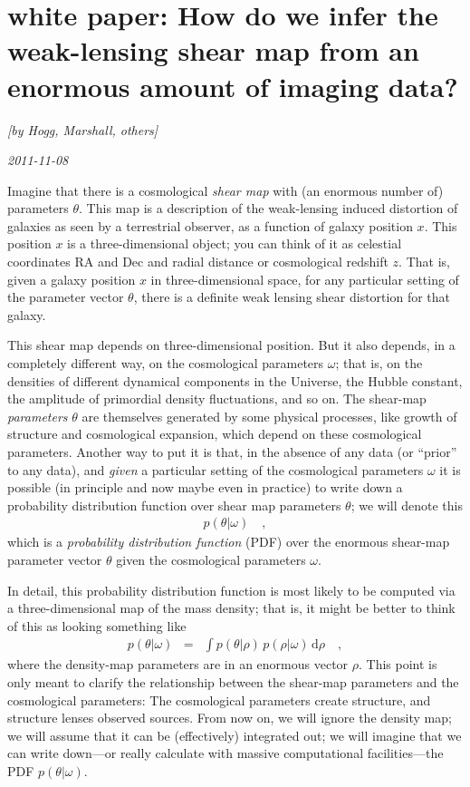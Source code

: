 \documentclass[12pt, pdftex]{article}
\newcommand{\dd}{\mathrm{d}}
\newcommand{\RA}{\mathrm{RA}}
\newcommand{\Dec}{\mathrm{Dec}}
\newcommand{\shearpars}{\theta}
\newcommand{\position}{x}
\newcommand{\cosmopars}{\omega}
\newcommand{\densitypars}{\rho}
\begin{document}
\section*{white paper: How do we infer the weak-lensing shear map from an enormous amount of imaging data?}

\noindent
\textsl{[by Hogg, Marshall, others]}

\noindent
\textsl{2011-11-08}

Imagine that there is a cosmological \emph{shear map} with (an
enormous number of) parameters $\shearpars$.  This map is a
description of the weak-lensing induced distortion of galaxies as seen
by a terrestrial observer, as a function of galaxy position
$\position$.  This position $\position$ is a three-dimensional object;
you can think of it as celestial coordinates $\RA$ and $\Dec$ and
radial distance or cosmological redshift $z$.  That is, given a galaxy
position $\position$ in three-dimensional space, for any particular
setting of the parameter vector $\shearpars$, there is a definite weak
lensing shear distortion for that galaxy.

This shear map depends on three-dimensional position.  But it also
depends, in a completely different way, on the cosmological parameters
$\cosmopars$; that is, on the densities of different dynamical
components in the Universe, the Hubble constant, the amplitude of
primordial density fluctuations, and so on.  The shear-map
\emph{parameters} $\shearpars$ are themselves generated by some
physical processes, like growth of structure and cosmological
expansion, which depend on these cosmological parameters.  Another way
to put it is that, in the absence of any data (or ``prior'' to any
data), and \emph{given} a particular setting of the cosmological
parameters $\cosmopars$ it is possible (in principle and now maybe
even in practice) to write down a probability distribution function
over shear map parameters $\shearpars$; we will denote this
\begin{eqnarray}\displaystyle
p(\shearpars|\cosmopars)
\quad ,
\end{eqnarray}
which is a \emph{probability distribution function} (PDF) over the
enormous shear-map parameter vector $\shearpars$ given the
cosmological parameters $\cosmopars$.

In detail, this probability distribution function is most likely to be
computed via a three-dimensional map of the mass density; that is, it
might be better to think of this as looking something like
\begin{eqnarray}\displaystyle
p(\shearpars|\cosmopars) &=& \int p(\shearpars|\densitypars)\,p(\densitypars|\cosmopars)\,\dd\densitypars
\quad ,
\end{eqnarray}
where the density-map parameters are in an enormous vector
$\densitypars$.  This point is only meant to clarify the relationship
between the shear-map parameters and the cosmological parameters: The
cosmological parameters create structure, and structure lenses
observed sources.  From now on, we will ignore the density map; we
will assume that it can be (effectively) integrated out; we will
imagine that we can write down---or really calculate with massive
computational facilities---the PDF $p(\shearpars|\cosmopars)$.
\end{document}
